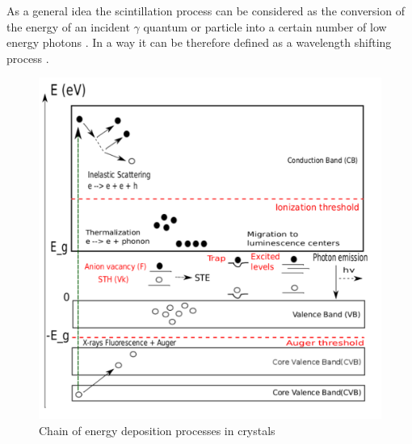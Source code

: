 As a general idea the scintillation process can be considered as the conversion of the energy of an incident $\gamma$ quantum or particle into a certain number of low energy photons \cite{Rodnyi1997}. In a way it can be therefore defined as a wavelength shifting process \cite{Lecoq2006}.
\begin{figure}
\centering
\includegraphics[width=12cm]{../Pictures/Chapter_2/drawing_2.pdf}
\caption[Energy deposition in scintillator]{Chain of energy deposition processes in crystals}
\label{fig:lecoq_easy}
\end{figure}

